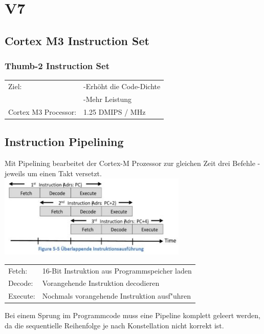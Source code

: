 \section{V7}
\begin{minipage}[t]{9cm}
	\subsection{Cortex M3 Instruction Set}
	\subsubsection{Thumb-2 Instruction Set}
    \begin{tabular}{l l}
        Ziel:&-Erhöht die Code-Dichte\\
            &  -Mehr Leistung\\ 
        Cortex M3 Processor:  & 1.25 DMIPS / MHz\\ 
    \end{tabular} 
    
\subsection{Instruction Pipelining}
                  Mit Pipelining bearbeitet der Cortex-M Prozessor zur gleichen Zeit drei Befehle - jeweils um einen Takt versetzt.\\
     \includegraphics[width=9cm]{images/pipelining}\\
     \begin{tabular}{m{1.5cm} m{6.5cm}}
        Fetch:& 16-Bit Instruktion aus Programmspeicher laden\\
        Decode:& Vorangehende Instruktion decodieren\\ 
        Execute:& Nochmals vorangehende Instruktion ausf"uhren\\
    \end{tabular} 
    Bei einem Sprung im Programmcode muss eine Pipeline komplett geleert werden, da die sequentielle Reihenfolge je nach Konstellation nicht korrekt ist.
\end{minipage}
%
\begin{minipage}[t]{0.5cm}
	\-\
\end{minipage}
